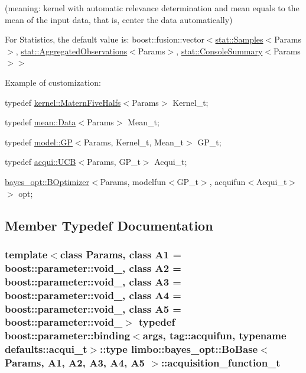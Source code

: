 (meaning\+: kernel with automatic relevance determination and mean equals to the mean of the input data, that is, center the data automatically)

For Statistics, the default value is\+: {\ttfamily boost\+::fusion\+::vector$<$\hyperlink{structlimbo_1_1stat_1_1_samples}{stat\+::\+Samples}$<$Params$>$, \hyperlink{structlimbo_1_1stat_1_1_aggregated_observations}{stat\+::\+Aggregated\+Observations}$<$Params$>$, \hyperlink{structlimbo_1_1stat_1_1_console_summary}{stat\+::\+Console\+Summary}$<$Params$>$$>$}

Example of customization\+:
\begin{DoxyItemize}
\item {\ttfamily typedef \hyperlink{structlimbo_1_1kernel_1_1_matern_five_halfs}{kernel\+::\+Matern\+Five\+Halfs}$<$Params$>$ Kernel\+\_\+t;}
\item {\ttfamily typedef \hyperlink{structlimbo_1_1mean_1_1_data}{mean\+::\+Data}$<$Params$>$ Mean\+\_\+t;}
\item {\ttfamily typedef \hyperlink{classlimbo_1_1model_1_1_g_p}{model\+::\+G\+P}$<$Params, Kernel\+\_\+t, Mean\+\_\+t$>$ G\+P\+\_\+t;}
\item {\ttfamily typedef \hyperlink{classlimbo_1_1acqui_1_1_u_c_b}{acqui\+::\+U\+C\+B}$<$Params, G\+P\+\_\+t$>$ Acqui\+\_\+t;}
\item {\ttfamily \hyperlink{classlimbo_1_1bayes__opt_1_1_b_optimizer}{bayes\+\_\+opt\+::\+B\+Optimizer}$<$Params, modelfun$<$G\+P\+\_\+t$>$, acquifun$<$Acqui\+\_\+t$>$$>$ opt;} 
\end{DoxyItemize}

\subsection{Member Typedef Documentation}
\hypertarget{classlimbo_1_1bayes__opt_1_1_bo_base_a02b14991b62e0f8c9bcf834220ed62e4}{}
\subsubsection[{acquisition\+\_\+function\+\_\+t}]{\setlength{\rightskip}{0pt plus 5cm}template$<$class Params, class A1 = boost\+::parameter\+::void\+\_\+, class A2 = boost\+::parameter\+::void\+\_\+, class A3 = boost\+::parameter\+::void\+\_\+, class A4 = boost\+::parameter\+::void\+\_\+, class A5 = boost\+::parameter\+::void\+\_\+$>$ typedef boost\+::parameter\+::binding$<${\bf args}, tag\+::acquifun, typename {\bf defaults\+::acqui\+\_\+t}$>$\+::type {\bf limbo\+::bayes\+\_\+opt\+::\+Bo\+Base}$<$ Params, A1, A2, A3, A4, A5 $>$\+::{\bf acquisition\+\_\+function\+\_\+t}}\label{classlimbo_1_1bayes__opt_1_1_bo_base_a02b14991b62e0f8c9bcf834220ed62e4}
\hypertarget{classlimbo_1_1bayes__opt_1_1_bo_base_a75c1ae9e7268016c6f767c56bcede7d2}{}
